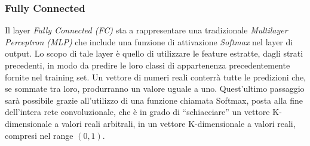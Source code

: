 \subsubsection{Fully Connected}
Il layer \emph{Fully Connected (FC)} sta a rappresentare una tradizionale \emph{Multilayer Perceptron (MLP)} 
che include una funzione di attivazione \emph{Softmax} nel layer 
di output. Lo scopo di tale layer è quello di utilizzare le feature estratte, 
dagli strati precedenti, in modo da predire le loro classi di appartenenza 
precedentemente fornite nel training set. Un vettore di numeri reali conterrà 
tutte le predizioni che, se sommate tra loro, produrranno un valore uguale a 
uno. Quest'ultimo passaggio sarà possibile grazie all'utilizzo di una funzione 
chiamata Softmax, posta alla fine dell'intera rete convoluzionale, che è in 
grado di “schiacciare” un vettore K-dimensionale a valori reali arbitrali, in 
un vettore K-dimensionale a valori reali, compresi nel range $(0,1)$. 

